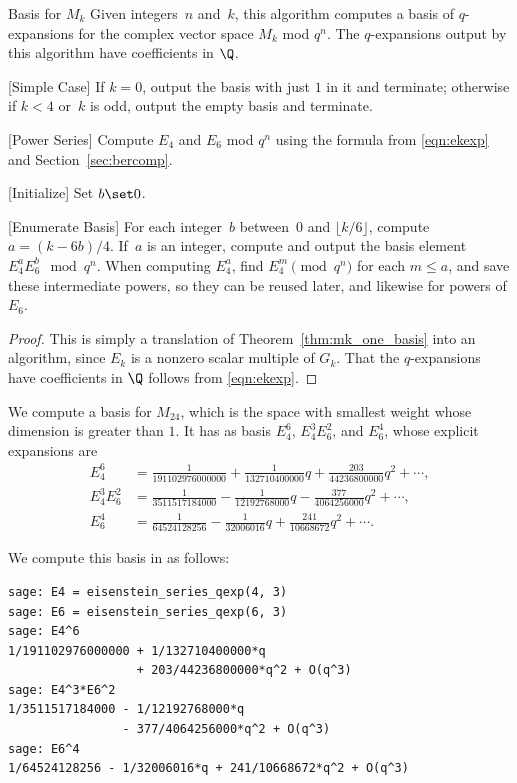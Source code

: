 \begin{algorithm}{Basis for $M_k$}\label{alg:basis}
Given integers~$n$ and~$k$, this algorithm computes
a basis of $q$-expansions for the complex vector
space $M_k$ mod $q^n$.   The $q$-expansions output
by this algorithm have coefficients in $\Q$.
\begin{steps}
\item{}[Simple Case] If $k=0$, output the basis with
just $1$ in it and terminate; otherwise if $k<4$ or~$k$ 
is odd, output the empty basis and terminate.
\item{}[Power Series] Compute $E_4$ and $E_6$ mod $q^n$
using the formula from \eqref{eqn:ekexp} and
Section~\ref{sec:bercomp}.
\item{}[Initialize] Set $b\set 0$.   
\item{}[Enumerate Basis] For each integer~$b$ between~$0$ and
$\lfloor k/6\rfloor$, compute $a=(k-6b)/4$.
If~$a$ is an integer, compute and output the basis
element $E_4^a E_6^b \mod{q^n}$.  When computing
$E_4^a$, find
$E_4^m\pmod{q^n}$ for each $m\leq a$, and save these
intermediate powers, so they can be reused later, and
likewise for powers of $E_6$.
\end{steps}
\end{algorithm}
\begin{proof}
This is simply a translation of Theorem~\ref{thm:mk_one_basis}
into an algorithm, since $E_k$ is a nonzero scalar multiple
of $G_k$.  That the $q$-expansions have coefficients
in $\Q$ follows from \eqref{eqn:ekexp}.
\end{proof}

\begin{example}
We compute a basis for $M_{24}$, which is the space with
smallest weight whose dimension is greater than $1$.
It has as basis $E_4^6$, $E_4^3 E_6^2$, and $E_6^4$, whose explicit
expansions are
\begin{align*}
  E_4^6 &= \frac{1}{191102976000000} +
   \frac{1}{132710400000}q + \frac{203}{44236800000}q^2 + \cdots,\\
E_4^3 E_6^2 &= 
    \frac{1}{3511517184000} - \frac{1}{12192768000}q - \frac{377}{4064256000}q^2
  + \cdots, \\
  E_6^4 &= \frac{1}{64524128256} - \frac{1}{32006016}q + 
    \frac{241}{10668672}q^2 +\cdots. 
\end{align*}
\vspace{1ex}

We compute this basis in \sage{} as follows:
\begin{verbatim}
sage: E4 = eisenstein_series_qexp(4, 3)
sage: E6 = eisenstein_series_qexp(6, 3)
sage: E4^6
1/191102976000000 + 1/132710400000*q 
                  + 203/44236800000*q^2 + O(q^3)
sage: E4^3*E6^2
1/3511517184000 - 1/12192768000*q 
                - 377/4064256000*q^2 + O(q^3)
sage: E6^4
1/64524128256 - 1/32006016*q + 241/10668672*q^2 + O(q^3)
\end{verbatim}
\end{example}

